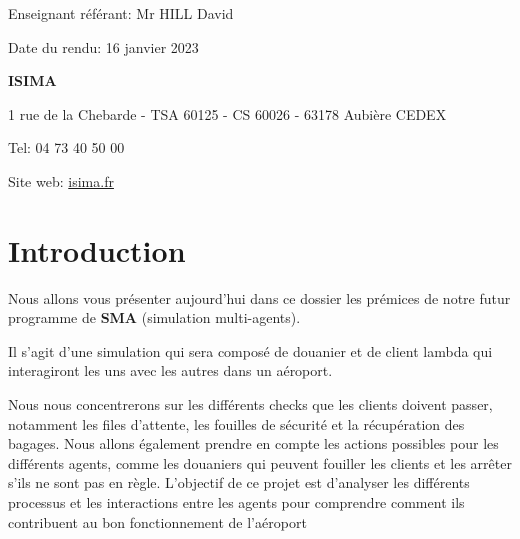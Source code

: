 \documentclass[12pt,french]{article} %
\begin{document}
\begin{titlepage}
  \vspace*{2cm} 
  
  \begin{flushright}\footnotesize %
    Enseignant référant: Mr HILL David
    
    Date du rendu: 16 janvier 2023
    
  \end{flushright}
  
  \begin{flushleft}\small %
    \textbf{ISIMA}
    \footnotesize
    
    1 rue de la Chebarde - TSA 60125 - CS 60026 - 63178 Aubière CEDEX
    
    Tel: 04 73 40 50 00
    
    Site web: \href{https://www.isima.fr/}{isima.fr}\newline
    	
  \end{flushleft}
\end{titlepage}	


\renewcommand{\contentsname}{Sommaire}
\normalsize\tableofcontents %

\bigskip

\section{Introduction}

Nous allons vous présenter aujourd'hui dans ce dossier les prémices de notre futur programme de \textbf{SMA} (simulation multi-agents).

\bigskip

Il s'agit d'une simulation qui sera composé de douanier et de client lambda qui interagiront les uns avec les autres dans un aéroport.

\bigskip

 Nous nous concentrerons sur les différents checks que les clients doivent passer, notamment les files d'attente, les fouilles de sécurité et la récupération des bagages. Nous allons également prendre en compte les actions possibles pour les différents agents, comme les douaniers qui peuvent fouiller les clients et les arrêter s'ils ne sont pas en règle. L'objectif de ce projet est d'analyser les différents processus et les interactions entre les agents pour comprendre comment ils contribuent au bon fonctionnement de l'aéroport
 
\end{document}
